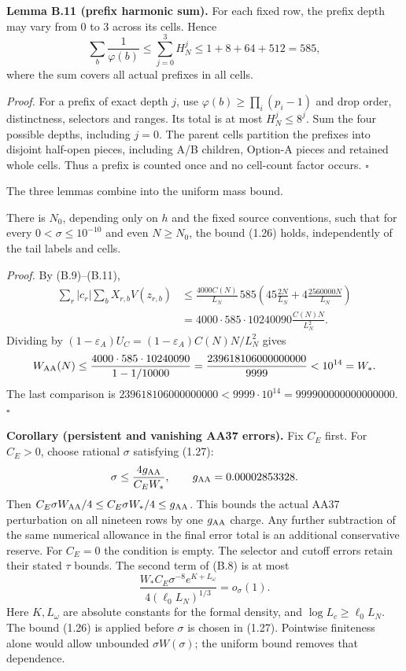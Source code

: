 \textbf{Lemma B.11 (prefix harmonic sum).} For each fixed row,
the prefix depth may vary from $0$ to $3$ across its cells. Hence
\[
 \sum_b\frac1{\varphi(b)}\le\sum_{j=0}^3H_N^j
 \le1+8+64+512=585,
 \tag{B.11}
\]
where the sum covers all actual prefixes in all cells.

\emph{Proof.} For a prefix of exact depth $j$,
use $\varphi(b)\ge\prod_i(p_i-1)$ and drop order, distinctness,
selectors and ranges. Its total is at most $H_N^j\le8^j$.
Sum the four possible depths, including $j=0$.
The parent cells partition the prefixes into disjoint half-open pieces,
including A/B children, Option-A pieces and retained whole cells.
Thus a prefix is counted once and no cell-count factor occurs. $\square$

The three lemmas combine into the uniform mass bound.

\begin{theorem}\label{thm:sieve-mass}
There is $N_0$, depending only on $h$ and the fixed source conventions,
such that for every $0<\sigma\le10^{-10}$ and even $N\ge N_0$,
the bound (1.26) holds, independently of the tail labels and cells.
\end{theorem}

\emph{Proof.} By (B.9)--(B.11),
\[
\begin{aligned}
 \sum_r|c_r|\sum_bX_{r,b}V(z_{r,b})
 &\le\frac{4000C(N)}{L_N}\,585
 \left(45\frac{2N}{L_N}+4\frac{2560000N}{L_N}\right)\\
 &=4000\cdot585\cdot10240090\frac{C(N)N}{L_N^2}.
\end{aligned}
\]
Dividing by $(1-\varepsilon_A)U_C=(1-\varepsilon_A)C(N)N/L_N^2$ gives
\[
 W_{\rm AA}(N)\le\frac{4000\cdot585\cdot10240090}{1-1/10000}
 =\frac{239618106000000000}{9999}<10^{14}=W_*.
\]
The last comparison is
$239618106000000000<9999\cdot10^{14}=999900000000000000$. $\square$

\textbf{Corollary (persistent and vanishing AA37 errors).}
Fix $C_E$ first.
For $C_E>0$, choose rational $\sigma$ satisfying (1.27):
\[
 \sigma\le\frac{4g_{\rm AA}}{C_EW_*},\qquad
 g_{\rm AA}=0.00002853328.
\]
Then $C_E\sigma W_{\rm AA}/4\le C_E\sigma W_*/4\le g_{\rm AA}$.
This bounds the actual AA37 perturbation on all nineteen rows by one
$g_{\rm AA}$ charge. Any further subtraction of the same numerical
allowance in the final error total is an additional conservative reserve.
For $C_E=0$ the condition is empty.
The selector and cutoff errors retain their stated $\tau$ bounds.
The second term of (B.8) is at most
\[
 \frac{W_*C_E\sigma^{-8}e^{K+L_\omega}}{4(\ell_0L_N)^{1/3}}
 =o_\sigma(1).
\]
Here $K,L_\omega$ are absolute constants for the formal density,
and $\log L_c\ge\ell_0L_N$.
The bound (1.26) is applied before $\sigma$ is chosen in (1.27).
Pointwise finiteness alone would allow unbounded $\sigma W(\sigma)$;
the uniform bound removes that dependence.


